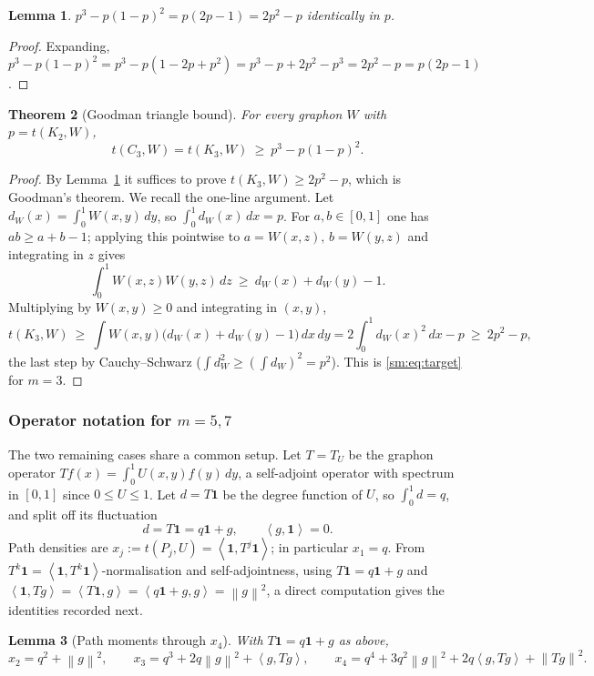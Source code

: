 \documentclass[11pt]{article}
\newtheorem{theorem}{Theorem}[section]
\newtheorem{lemma}[theorem]{Lemma}
\theoremstyle{remark}
\theoremstyle{plain}
\theoremstyle{plain}
\newcommand{\one}{\mathbf 1}
\newcommand{\ip}[2]{\left\langle #1,#2\right\rangle}
\newcommand{\norm}[1]{\left\|#1\right\|}
\begin{document}
\begin{lemma}\label{sm:lem:g3}
$\displaystyle p^{3}-p(1-p)^{2}=p(2p-1)=2p^{2}-p$ identically in $p$.
\end{lemma}

\begin{proof}
Expanding, $p^3-p(1-p)^2=p^3-p(1-2p+p^2)=p^3-p+2p^2-p^3=2p^2-p=p(2p-1)$.
\end{proof}

\begin{theorem}[Goodman triangle bound]\label{sm:thm:C3}
For every graphon $W$ with $p=t(K_2,W)$,
\[
        t(C_3,W)=t(K_3,W)\ \ge\ p^{3}-p(1-p)^{2}.
\]
\end{theorem}

\begin{proof}
By Lemma~\ref{sm:lem:g3} it suffices to prove $t(K_3,W)\ge 2p^2-p$, which is
Goodman's theorem.  We recall the one-line argument.  Let
$d_W(x)=\int_0^1 W(x,y)\,dy$, so $\int_0^1 d_W(x)\,dx=p$.  For
$a,b\in[0,1]$ one has $ab\ge a+b-1$; applying this pointwise to
$a=W(x,z),\,b=W(y,z)$ and integrating in $z$ gives
\[
        \int_0^1 W(x,z)W(y,z)\,dz\ \ge\ d_W(x)+d_W(y)-1 .
\]
Multiplying by $W(x,y)\ge0$ and integrating in $(x,y)$,
\[
        t(K_3,W)\ \ge\ \int W(x,y)\bigl(d_W(x)+d_W(y)-1\bigr)\,dx\,dy
        =2\!\int_0^1 d_W(x)^2\,dx-p
        \ \ge\ 2p^2-p ,
\]
the last step by Cauchy--Schwarz ($\int d_W^2\ge(\int d_W)^2=p^2$).  This is
\eqref{sm:eq:target} for $m=3$.
\end{proof}

\subsubsection{Operator notation for \texorpdfstring{$m=5,7$}{m=5,7}}
\label{sm:sub:ops}

The two remaining cases share a common setup.  Let $T=T_U$ be the graphon
operator $Tf(x)=\int_0^1 U(x,y)f(y)\,dy$, a self-adjoint operator with
spectrum in $[0,1]$ since $0\le U\le1$.  Let $d=T\one$ be the degree function
of $U$, so $\int_0^1 d=q$, and split off its fluctuation
\[
        d=T\one=q\one+g,\qquad \ip{g}{\one}=0 .
\]
Path densities are $x_j:=t(P_j,U)=\ip{\one}{T^{j}\one}$; in particular
$x_1=q$.  From $T^{k}\one=\ip{\one}{T^{k}\one}$-normalisation and
self-adjointness, using $T\one=q\one+g$ and
$\ip{\one}{Tg}=\ip{T\one}{g}=\ip{q\one+g}{g}=\norm{g}^2$, a direct
computation gives the identities recorded next.

\begin{lemma}[Path moments through $x_4$]\label{sm:lem:moments}
With $T\one=q\one+g$ as above,
\[
   x_2=q^{2}+\norm{g}^{2},\qquad
   x_3=q^{3}+2q\norm{g}^{2}+\ip{g}{Tg},\qquad
   x_4=q^{4}+3q^{2}\norm{g}^{2}+2q\ip{g}{Tg}+\norm{Tg}^{2}.
\]
\end{lemma}
\end{document}
